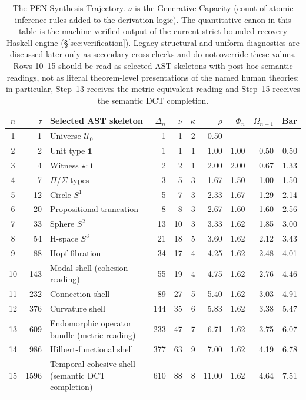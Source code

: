 \documentclass[11pt,a4paper]{article}
\theoremstyle{plain}
\theoremstyle{definition}
\theoremstyle{remark}
\newcommand{\U}{\mathcal{U}}
\begin{document}
\begin{table}[tbp]
\centering
\caption{The PEN Synthesis Trajectory.  $\nu$ is the Generative Capacity (count of atomic inference rules added to the derivation logic).  The quantitative canon in this table is the machine-verified output of the current strict bounded recovery Haskell engine (\S\ref{sec:verification}).  Legacy structural and uniform diagnostics are discussed later only as secondary cross-checks and do not override these values.  Rows 10--15 should be read as selected AST skeletons with post-hoc semantic readings, not as literal theorem-level presentations of the named human theories; in particular, Step~13 receives the metric-equivalent reading and Step~15 receives the semantic DCT completion.}
\label{tab:genesis}
\small
\setlength{\tabcolsep}{3pt}
\begin{tabular}{@{}cr l rrrr rrr@{}}
\toprule
$n$ & $\tau$ & Selected AST skeleton & $\Delta_n$ & $\nu$ & $\kappa$ & $\rho$ & $\Phi_n$ & $\Omega_{n-1}$ & Bar \\
\midrule
1  & 1    & Universe $\U_0$              & 1   & 1   & 2 & 0.50  & ---  & ---  & ---  \\
2  & 2    & Unit type $\mathbf{1}$       & 1   & 1   & 1 & 1.00  & 1.00 & 0.50 & 0.50 \\
3  & 4    & Witness $\star : \mathbf{1}$ & 2   & 2   & 1 & 2.00  & 2.00 & 0.67 & 1.33 \\
4  & 7    & $\Pi$/$\Sigma$ types         & 3   & 5   & 3 & 1.67  & 1.50 & 1.00 & 1.50 \\
\midrule
5  & 12   & Circle $S^1$                 & 5   & 7   & 3 & 2.33  & 1.67 & 1.29 & 2.14 \\
6  & 20   & Propositional truncation     & 8   & 8   & 3 & 2.67  & 1.60 & 1.60 & 2.56 \\
7  & 33   & Sphere $S^2$                 & 13  & 10  & 3 & 3.33  & 1.62 & 1.85 & 3.00 \\
8  & 54   & H-space $S^3$                & 21  & 18  & 5 & 3.60  & 1.62 & 2.12 & 3.43 \\
9  & 88   & Hopf fibration               & 34  & 17  & 4 & 4.25  & 1.62 & 2.48 & 4.01 \\
\midrule
10 & 143  & Modal shell (cohesion reading)              & 55  & 19  & 4 & 4.75  & 1.62 & 2.76 & 4.46 \\
11 & 232  & Connection shell                            & 89  & 27  & 5 & 5.40  & 1.62 & 3.03 & 4.91 \\
12 & 376  & Curvature shell                             & 144 & 35  & 6 & 5.83  & 1.62 & 3.38 & 5.47 \\
13 & 609  & Endomorphic operator bundle (metric reading) & 233 & 47  & 7 & 6.71  & 1.62 & 3.75 & 6.07 \\
14 & 986  & Hilbert-functional shell                    & 377 & 63  & 9 & 7.00  & 1.62 & 4.19 & 6.78 \\
\midrule
15 & 1596 & Temporal-cohesive shell (semantic DCT completion) & 610 & 88  & 8 & 11.00 & 1.62 & 4.64 & 7.51 \\
\bottomrule
\end{tabular}
\end{table}
\end{document}
